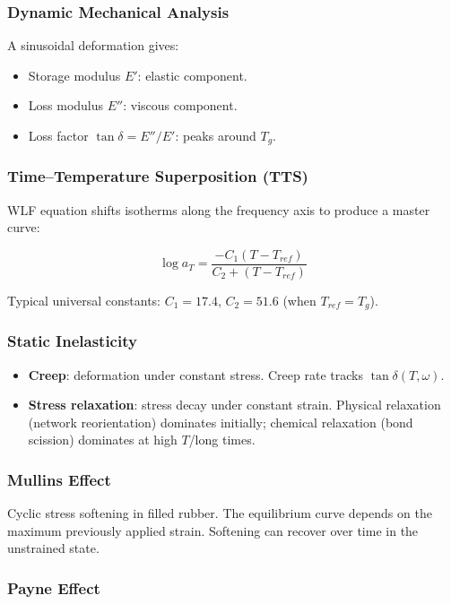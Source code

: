 \documentclass{NoteThesis/note-thesis}
\begin{document}
\subsubsection*{Dynamic Mechanical Analysis}

A sinusoidal deformation gives:

\begin{itemize}
    \item Storage modulus $E'$: elastic component.
    \item Loss modulus $E''$: viscous component.
    \item Loss factor $\tan\delta = E''/E'$: peaks around $T_g$.
\end{itemize}

\subsubsection*{Time--Temperature Superposition (TTS)}

WLF equation shifts isotherms along the frequency axis to produce a master curve:

\[
\log a_T = \frac{-C_1(T - T_{ref})}{C_2 + (T - T_{ref})}
\]

Typical universal constants: $C_1 = 17.4$, $C_2 = 51.6$ (when $T_{ref} = T_g$).

\subsubsection*{Static Inelasticity}

\begin{itemize}
    \item \textbf{Creep}: deformation under constant stress. Creep rate tracks $\tan\delta(T,\omega)$.
    \item \textbf{Stress relaxation}: stress decay under constant strain. Physical relaxation (network reorientation) dominates initially; chemical relaxation (bond scission) dominates at high $T$/long times.
\end{itemize}

\subsubsection*{Mullins Effect}

Cyclic stress softening in filled rubber. The equilibrium curve depends on the maximum previously applied strain. Softening can recover over time in the unstrained state.

\subsubsection*{Payne Effect}
\end{document}
